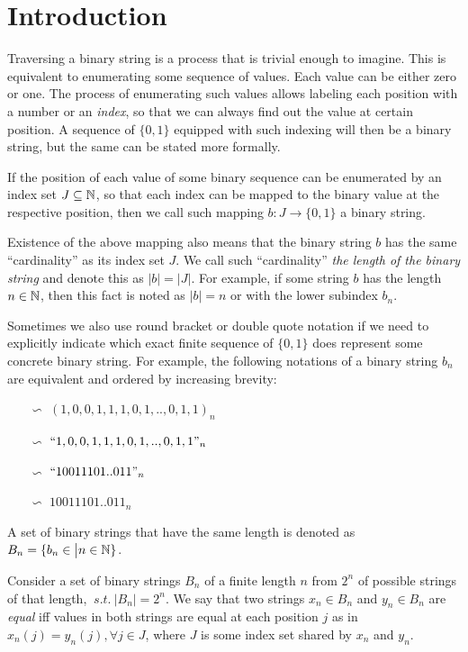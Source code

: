 \section{Introduction}

Traversing a binary string is a process that is trivial enough to imagine.  This is equivalent to enumerating some sequence of values. Each value can be either zero or one. The process of enumerating such values allows labeling each position with a number or an \textit{index}, so that we can always find out the value at certain position. A sequence of $\{0,1\}$ equipped with such indexing will then be a binary string, but the same can be stated more formally.

\begin{definition}\label{def_binstr}
    If the position of each value of some binary sequence can be enumerated by an index set $J\subseteq \mathbb{N}$, so that each index can be mapped to the binary value at the respective position, then we call such mapping $b : J \to \{0, 1\}$ a binary string.
\end{definition}

Existence of the above mapping also means that the binary string $b$ has the same ``cardinality'' as its index set $J$. We call such ``cardinality'' \textit{the length of the binary string} and denote this as $|b| = |J|$. For example, if some string $b$ has the length $n\in \mathbb{N}$, then this fact is noted as $|b| = n$ or with the lower subindex $b_n$.

Sometimes we also use round bracket or double quote notation if we need to explicitly indicate which exact finite sequence of $\{0, 1\}$ does represent some concrete binary string. For example, the following notations of a binary string $b_n$ are equivalent and ordered by increasing brevity:

\begin{itemize}
    \item[$\backsim$] $(1,0,0,1,1,1,0,1,..,0,1,1)_n$
    \item[$\backsim$] $\text{``}1,0,0,1,1,1,0,1,..,0,1,1\text{''}_n$
    \item[$\backsim$] $\text{``}10011101..011\text{''}_n$
    \item[$\backsim$] $10011101..011_n$
\end{itemize}

A set of binary strings that have the same length is denoted as $B_n = \{ b_n \in \big| n \in \mathbb{N} \}$.

\begin{definition}
    Consider a set of binary strings $B_n$ of a finite length $n$ from $2^n$ of possible strings of that length, $\ s.t.\ |B_n| = 2^n$. We say that two strings $x_n \in B_n$ and $y_n \in B_n$ are \textit{equal} iff values in both strings are equal at each position $j$ as in $x_n(j) = y_n(j), \forall j \in J $, where $J$ is some index set shared by $x_n$ and $y_n$.
\end{definition}

